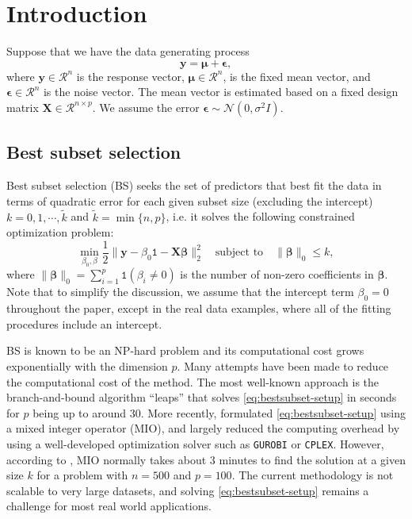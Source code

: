\section{Introduction}
Suppose that we have the data generating process
\begin{equation}
\mathbf{y}=\mathbf{\mu}+\mathbf{\epsilon},
\label{eq:truemodel_def}
\end{equation}
where $\mathbf{y}\in \mathcal{R}^n$ is the response vector, $\mathbf{\mu} \in \mathcal{R}^n$, is the fixed mean vector, and $\mathbf{\epsilon} \in \mathcal{R}^n$ is the noise vector. The mean vector is estimated based on a fixed design matrix $\mathbf{X}\in \mathcal{R}^{n\times p}$. We assume the error $\mathbf{\epsilon} \sim \mathcal{N}(0,\sigma^2 I)$.

\subsection{Best subset selection}
Best subset selection (BS) \citep{Hocking1967} seeks the set of predictors that best fit the data in terms of quadratic error for each given subset size (excluding the intercept) $k = 0,1,\cdots,\tilde{k}$ and $\tilde{k} = \min\{n,p\}$, i.e. it solves the following constrained optimization problem:
\begin{equation}
\min_{\beta_0, \beta} \frac{1}{2} \lVert \mathbf{y}-\beta_0\mathtt{1} -\mathbf{X\beta}\rVert_2^2 \quad \text{subject to} \quad \lVert \mathbf{\beta} \rVert_0 \le k,
\label{eq:bestsubset-setup}
\end{equation}
where $\lVert \mathbf{\beta} \rVert_0 = \sum_{i=1}^{p} \mathtt{1}(\beta_i \ne 0)$ is the number of non-zero coefficients in $\mathbf{\beta}$. Note that to simplify the discussion, we assume that the intercept term $\beta_0=0$ throughout the paper, except in the real data examples, where all of the fitting procedures include an intercept.


BS is known to be an NP-hard problem \citep{Natarajan1995} and its computational cost grows exponentially with the dimension $p$. Many attempts have been made to reduce the computational cost of the method. The most well-known approach is the branch-and-bound algorithm ``leaps'' \citep{Furnival1974} that solves \eqref{eq:bestsubset-setup} in seconds for $p$ being up to around $30$. More recently, \citet{Bertsimas2016} formulated \eqref{eq:bestsubset-setup} using a mixed integer operator (MIO), and largely reduced the computing overhead by using a well-developed optimization solver such as {\tt GUROBI} or {\tt CPLEX}. However, according to \citet{Hastie2017}, MIO normally takes about $3$ minutes to find the solution at a given size $k$ for a problem with $n=500$ and $p=100$. The current methodology is not scalable to very large datasets, and solving \eqref{eq:bestsubset-setup} remains a challenge for most real world applications.

